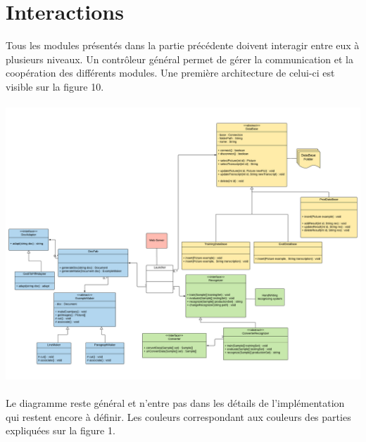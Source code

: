 \paragraph{}

\section{Interactions}

Tous les modules présentés dans la partie précédente doivent interagir entre eux à plusieurs niveaux. Un contrôleur général permet de gérer la communication et la coopération des différents modules. Une première architecture de celui-ci est visible sur la figure 10.

\paragraph{}

\begin{mdframed}[frametitle={Figure 11 : Diagramme de classes du contrôleur}, innerbottommargin=10]
\begin{center}
\includegraphics[scale=0.6]{Specifications.pdf}
\end{center}
\end{mdframed}

\paragraph{}

Le diagramme reste général et n’entre pas dans les détails de l’implémentation qui restent encore à définir. Les couleurs correspondant aux couleurs des parties expliquées sur la figure 1.

